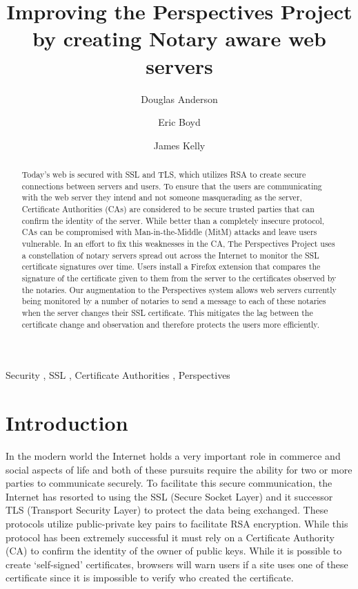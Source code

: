 \documentclass[preprint,review,12pt]{elsarticle}
\begin{document}
\begin{frontmatter}

\title{Improving the Perspectives Project by creating Notary aware web servers}

\author[doug]{Douglas Anderson}
\author[eric]{Eric Boyd}
\author[james]{James Kelly}
\address[doug]{dander01@uoguelph.ca}
\address[eric]{boyde@uoguelph.ca}
\address[james]{kellyj@uoguelph.ca}


\begin{abstract}

Today's web is secured with SSL and TLS, which utilizes RSA to create secure
connections between servers and users. To ensure that the users are
communicating with the web server they intend and not someone masquerading as
the server, Certificate Authorities (CAs) are considered to be secure trusted
parties that can confirm the identity of the server. While better than a 
completely insecure protocol, CAs can be compromised with Man-in-the-Middle
(MitM) attacks and leave users vulnerable. In an effort to fix this
weaknesses in the CA, The Perspectives Project uses a
constellation of notary servers spread out across the Internet to monitor the
SSL certificate signatures over time. Users install a Firefox extension that
compares the signature of the certificate given to them from the server to the
certificates observed by the notaries. Our augmentation to the Perspectives
system allows web servers currently being monitored by a number of notaries to
send a message to each of these notaries when the server changes their SSL 
certificate. This mitigates the lag between the certificate change and 
observation and therefore protects the users more efficiently.

\end{abstract}

\begin{keyword}
Security \sep
SSL \sep
Certificate Authorities \sep
Perspectives
\end{keyword}

\end{frontmatter}

\section{Introduction}
\label{intro}

In the modern world the Internet holds a very important role in commerce and
social aspects of life and both of these pursuits require the ability for two or
more parties to communicate securely. To facilitate this secure communication,
the Internet has resorted to using the SSL (Secure Socket Layer) and it
successor TLS (Transport Security Layer) to protect the data being exchanged.
These protocols utilize public-private key pairs to facilitate RSA encryption.
While this protocol has been extremely successful it must rely on a Certificate Authority (CA) to
confirm the identity of the owner of public keys. While it is possible to
create `self-signed' certificates, browsers will warn users if a site uses one
of these certificate since it is impossible to verify who created the
certificate. 
\end{document}
